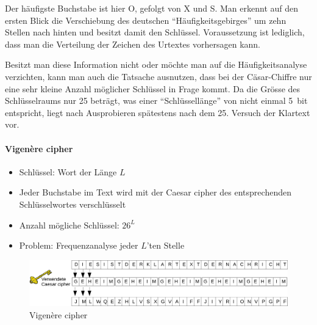 \documentclass[10pt,a4paper]{article}
\begin{document}
\noindent
Der häufigste Buchstabe ist hier O, gefolgt von X und S. Man erkennt auf den ersten Blick die Verschiebung des deutschen "`Häufigkeitsgebirges"' um zehn Stellen nach hinten und besitzt damit den Schlüssel. Voraussetzung ist lediglich, dass man die Verteilung der Zeichen des Urtextes vorhersagen kann.

\noindent
Besitzt man diese Information nicht oder möchte man auf die Häufigkeitsanalyse verzichten, kann man auch die Tatsache ausnutzen, dass bei der Cäsar-Chiffre nur eine sehr kleine Anzahl möglicher Schlüssel in Frage kommt. Da die Grösse des Schlüsselraums nur 25 beträgt, was einer "`Schlüssellänge"' von nicht einmal 5~bit entspricht, liegt nach Ausprobieren spätestens nach dem 25. Versuch der Klartext vor.

\paragraph*{Vigenère cipher}\label{para:Vigenère cipher}
\begin{itemize}[noitemsep,topsep=0pt,leftmargin=*]
    \item Schlüssel: Wort der Länge $L$
    \item Jeder Buchstabe im Text wird mit der Caesar cipher des entsprechenden Schlüsselwortes verschlüsselt
    \item Anzahl mögliche Schlüssel: $26^L$
    \item Problem: Frequenzanalyse jeder $L$'ten Stelle
\end{itemize}
\begin{figure}[H]
    \begin{center}
    \includegraphics[width=16cm]{images/vigenere.png}
    \caption{Vigenère cipher}
    \label{vigenere}
    \end{center}
\end{figure}

\pagebreak
\end{document}
